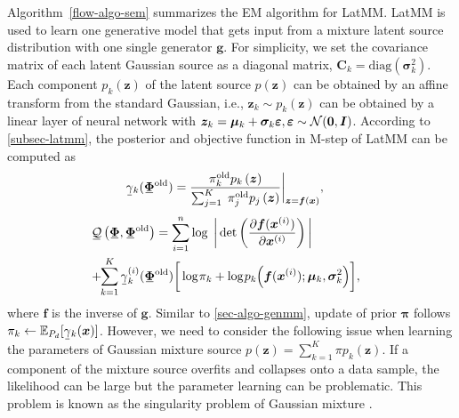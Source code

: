 Algorithm~\ref{flow-algo-sem} summarizes the EM algorithm for LatMM.
LatMM is used to
learn one generative model that gets input from a mixture latent source
distribution with one single generator $\bm{g}$. For simplicity, we set
the covariance matrix of each latent Gaussian source as a diagonal
matrix, $\bm{C}_k = \mathrm{diag}(\bm{\sigma}_k^2) $. Each component $p_k(\bm{z})$ of
the latent source $p(\bm{z})$ can be obtained by an affine transform from
the standard Gaussian, {i.e.}, $\bm{z}_k \sim p_k(\bm{z})$ can be
obtained by a linear layer of neural network with $\bm{z}_k = \bm{\mu}_k
+ \bm{\sigma}_k \bm{\varepsilon}, \bm{\varepsilon} \sim \mathcal{N}(\bm{0}, \bm{I})$.
According to \autoref{subsec-latmm}, the posterior and objective function in M-step of LatMM can be computed as
\begin{align}\label{em-latmm-gamma}
  &\ubar{\gamma}_k(\ubar{\bm{\Phi}}^{\mathrm{old}}) = \frac{\pi_k^{\mathrm{old}} p_k\left(\bm{z}\right)}{\sum_{j=1}^K\;\pi_j^{\mathrm{old}} p_j\left(\bm{z}\right)}\bigg|_{\bm{z}=\bm{f}(\bm{x})},
\end{align}\vspace{-0.42cm}
\begin{align}\label{eq-latmm-obj}
  &\hspace{-8pt}\ubar{\Qq}\left( \ubar{\bm{\Phi}},\ubar{\bm{\Phi}}^{\mathrm{old}}\right)
    =\sum_{i=1}^n \log\;\bigg|\det\left(
    \pd{\bm{f}(\bm{x}^{(i)})}{\bm{x}^{(i)}} \right)\bigg| \nonumber \\ 
  &\hspace{-10pt}+\hspace{-3pt} \sum_{k=1}^{K}\ubar{\gamma}_k^{(i)}(\ubar{\bm{\Phi}}^{\mathrm{old}})\bigg[ \log\hspace{-1pt}{\pi_k}
    +\log\hspace{-1pt}{p_k\hspace{-2pt}\left(\bm{f}(\bm{x}^{(i)}); \bm{\mu}_k, \bm{\sigma}_k^2\right)}\bigg], 
\end{align}
where $\bm{f}$ is the inverse of $\bm{g}$.
Similar to \autoref{sec-algo-genmm}, update of prior $\bm{\pi}$
follows $\pi_k \leftarrow \EE_{P_d}[ \ubar{\gamma}_k(\bm{x})
]$. However, we need to consider the following issue when learning the parameters of
Gaussian mixture source $p(\bm{z}) = \sum_{k=1}^K \pi p_k(\bm{z})$. If a component of the mixture source overfits and collapses onto a data sample, the likelihood can be large but the parameter learning can be problematic. This problem is known as the singularity problem of Gaussian mixture \cite{Bishop:2006:PRM:1162264}.
